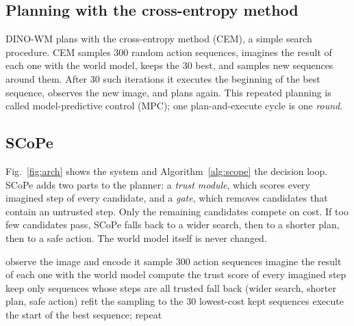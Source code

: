 \documentclass[conference]{IEEEtran}
\begin{document}
\subsection{Planning with the cross-entropy method}
DINO-WM plans with the cross-entropy method (CEM), a simple search procedure. CEM samples 300 random action sequences,
imagines the result of each one with the world model, keeps the 30 best, and samples new sequences around them. After
30 such iterations it executes the beginning of the best sequence, observes the new image, and plans again. This
repeated planning is called model-predictive control (MPC); one plan-and-execute cycle is one \emph{round}.

\subsection{SCoPe}
Fig.~\ref{fig:arch} shows the system and Algorithm~\ref{alg:scope} the decision loop. SCoPe adds two parts to the
planner: a \emph{trust module}, which scores every imagined step of every candidate, and a \emph{gate}, which removes
candidates that contain an untrusted step. Only the remaining candidates compete on cost. If too few candidates pass,
SCoPe falls back to a wider search, then to a shorter plan, then to a safe action. The world model itself is never
changed.

\begin{algorithm}[t]
\caption{SCoPe planning round}\label{alg:scope}
\begin{algorithmic}[1]
\State observe the image and encode it
  \State sample 300 action sequences
  \State imagine the result of each one with the world model
  \State compute the trust score of every imagined step
  \State keep only sequences whose steps are all trusted
   \State fall back (wider search, shorter plan, safe action) \EndIf
  \State refit the sampling to the 30 lowest-cost kept sequences
\EndFor
\State execute the start of the best sequence; repeat
\end{algorithmic}
\end{algorithm}
\end{document}
